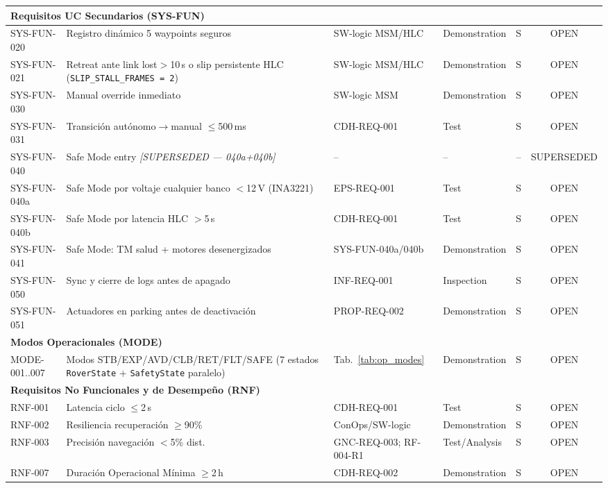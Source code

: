 \begin{landscape}
\begin{longtable}{| l | p{4.8cm} | p{3.6cm} | l | c | c |}
\multicolumn{6}{|l|}{\textbf{Requisitos UC Secundarios (SYS-FUN)}} \\ \hline
SYS-FUN-020 & Registro dinámico 5 waypoints seguros & SW-logic MSM/HLC & Demonstration & S & OPEN \\
SYS-FUN-021 & Retreat ante link lost$>$10\,s o slip persistente HLC (\texttt{SLIP\_STALL\_FRAMES = 2}) & SW-logic MSM/HLC & Demonstration & S & OPEN \\
SYS-FUN-030 & Manual override inmediato & SW-logic MSM & Demonstration & S & OPEN \\
SYS-FUN-031 & Transición autónomo$\rightarrow$manual $\le$500\,ms & CDH-REQ-001 & Test & S & OPEN \\
SYS-FUN-040 & Safe Mode entry \textit{[SUPERSEDED — 040a+040b]} & -- & -- & -- & SUPERSEDED \\
SYS-FUN-040a & Safe Mode por voltaje cualquier banco $<$12\,V (INA3221) & EPS-REQ-001 & Test & S & OPEN \\
SYS-FUN-040b & Safe Mode por latencia HLC $>$5\,s & CDH-REQ-001 & Test & S & OPEN \\
SYS-FUN-041 & Safe Mode: TM salud + motores desenergizados & SYS-FUN-040a/040b & Demonstration & S & OPEN \\
SYS-FUN-050 & Sync y cierre de logs antes de apagado & INF-REQ-001 & Inspection & S & OPEN \\
SYS-FUN-051 & Actuadores en parking antes de deactivación & PROP-REQ-002 & Demonstration & S & OPEN \\ \hline

\multicolumn{6}{|l|}{\textbf{Modos Operacionales (MODE)}} \\ \hline
MODE-001..007 & Modos STB/\allowbreak EXP/\allowbreak AVD/\allowbreak CLB/\allowbreak RET/\allowbreak FLT/\allowbreak SAFE (7 estados \texttt{RoverState} + \texttt{SafetyState} paralelo) & Tab.~\ref{tab:op_modes} & Demonstration & S & OPEN \\ \hline

\multicolumn{6}{|l|}{\textbf{Requisitos No Funcionales y de Desempeño (RNF)}} \\ \hline
RNF-001 & Latencia ciclo $\le$2\,s & CDH-REQ-001 & Test & S & OPEN \\
RNF-002 & Resiliencia recuperación $\ge$90\% & ConOps/SW-logic & Demonstration & S & OPEN \\
RNF-003 & Precisión navegación $<$5\% dist. & GNC-REQ-003; RF-004-R1 & Test/Analysis & S & OPEN \\
RNF-007 & Duración Operacional Mínima $\ge$2\,h & CDH-REQ-002 & Demonstration & S & OPEN \\ \hline


\end{longtable}
\end{landscape}

